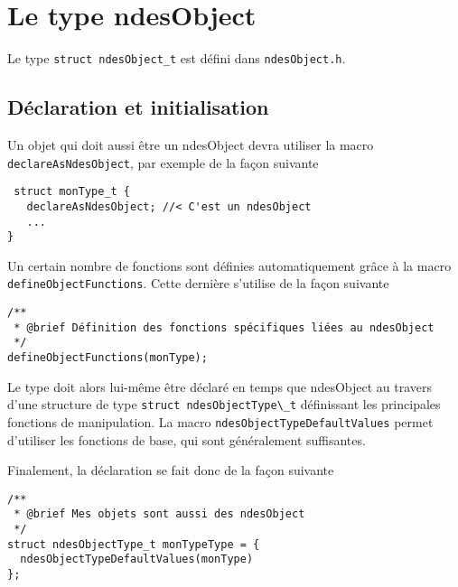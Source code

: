 %
\section{Le type ndesObject}

   Le type {\tt struct ndesObject\_t} est défini dans {\tt ndesObject.h}.

%
\subsection{Déclaration et initialisation}

   Un objet qui doit aussi être un ndesObject devra utiliser la macro
   \lstinline{declareAsNdesObject}, par exemple de la façon suivante


\begin{verbatim}
 struct monType_t {
   declareAsNdesObject; //< C'est un ndesObject 
   ...
}
\end{verbatim}

   Un certain nombre de fonctions sont définies automatiquement grâce
à la macro \lstinline{defineObjectFunctions}. Cette dernière s'utilise
de la façon suivante

\begin{verbatim}
/**
 * @brief Définition des fonctions spécifiques liées au ndesObject
 */
defineObjectFunctions(monType);
\end{verbatim}

   Le type doit alors lui-même être déclaré en temps que ndesObject au
travers d'une structure de type \lstinline{struct ndesObjectType\_t}
définissant les principales fonctions de manipulation. La macro
\lstinline{ndesObjectTypeDefaultValues} permet d'utiliser les
fonctions de base, qui sont généralement suffisantes.

   Finalement, la déclaration se fait donc de la façon suivante
   
\begin{verbatim}
/**
 * @brief Mes objets sont aussi des ndesObject
 */
struct ndesObjectType_t monTypeType = {
  ndesObjectTypeDefaultValues(monType)
};
\end{verbatim}

